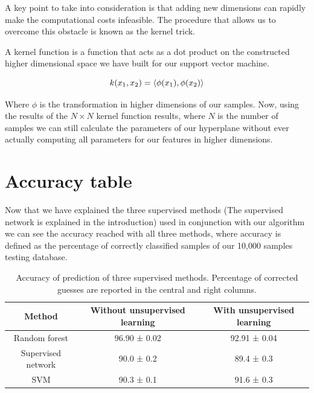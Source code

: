 \documentclass[a4paper]{report}
\begin{document}
A key point to take into consideration is that adding new dimensions can rapidly make the computational costs infeasible.
The procedure that allows us to overcome this obstacle is known as the kernel trick.

A kernel function is a function that acts as a dot product on the constructed higher dimensional space we have built for our support vector machine.

\begin{equation}
    k(x_1,x_2)= \braket{\phi (x_1),\phi (x_2)}
\end{equation}

Where $\phi$ is the transformation in higher dimensions of our samples.
Now, using the results of the $N \times N$ kernel function results, where $N$ is the number of samples we can still calculate the parameters of our hyperplane without ever actually computing all parameters for our features in higher dimensions.

\section{Accuracy table}

Now that we have explained the three supervised methods (The supervised network is explained in the introduction) used in conjunction with our algorithm we can see the accuracy reached with all three methods, where accuracy is defined as the percentage of correctly classified samples of our 10,000 samples testing database.

\begin{table}[h!]
  \begin{center}
    \begin{tabular}{c|c|c} %
      \textbf{Method} & \textbf{Without unsupervised learning} & \textbf{With unsupervised learning}\\
      \hline
      Random forest & 96.90  ± 0.02 & 92.91 ± 0.04\\
      Supervised network & 90.0 ± 0.2 & 89.4 ± 0.3 \\
      SVM & 90.3 ± 0.1 & 91.6 ± 0.3 \\
    \end{tabular}
    \label{bbb}
  \end{center}
  \caption{Accuracy of prediction of three supervised methods. Percentage of corrected guesses are reported in the central and right columns.}
\end{table}
\end{document}
